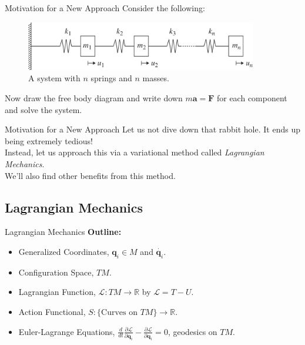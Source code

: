 \documentclass[usenames,dvipsnames]{beamer}
\theoremstyle{definition}
\theoremstyle{theorem}
\newcommand{\R}{\mathbb{R}}
\begin{document}
        \begin{frame}{Motivation for a New Approach}
            Consider the following:
            \begin{figure}
                \centering
                \includegraphics[width=0.9\textwidth]{Lagrangian_Mechanics/n_spring_mass.jpg}
                \caption{A system with $n$ springs and $n$ masses.}
                \label{fig:my_label}
            \end{figure}
            Now draw the free body diagram and write down $m\mathbf{a}=\mathbf{F}$ for each component and solve the system.
        \end{frame}
        
        \begin{frame}{Motivation for a New Approach}
            Let us not dive down that rabbit hole.  It ends up being extremely tedious!\\
            \vspace{.5cm}
            \noindent Instead, let us approach this via a variational method called \emph{Lagrangian Mechanics}.\\
            \vspace{.5cm}
            We'll also find other benefits from this method.
        \end{frame}
        
    \subsection{Lagrangian Mechanics}    
        
        \begin{frame}{Lagrangian Mechanics}
            \textbf{Outline:}
            \begin{itemize}
                \item Generalized Coordinates, $\mathbf{q}_i\in M$ and $\dot{\mathbf{q}_i}$.
                \item Configuration Space, $TM$.
                \item Lagrangian Function, $\mathcal{L}\colon TM \to \R$ by $\mathcal{L}=T-U$.
                \item Action Functional, $S\colon \{\textrm{Curves on $TM$}\} \to \R$.
                \item Euler-Lagrange Equations, $\displaystyle{\frac{d}{dt}\frac{\partial \mathcal{L}}{\partial \dot{\mathbf{q}_i}}-\frac{\partial \mathcal{L}}{\partial \mathbf{q}_i}=0}$, geodesics on $TM$.
            \end{itemize}
        \end{frame}
    
\end{document}
